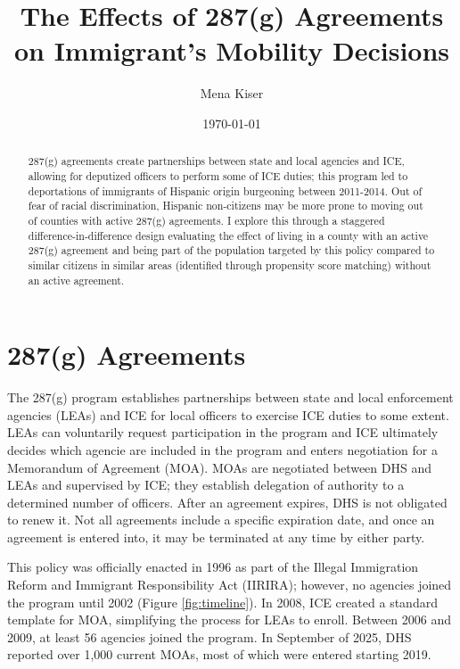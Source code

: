 \documentclass{article}
\title{The Effects of 287(g) Agreements on Immigrant's Mobility Decisions}
\author{Mena Kiser}
\date{\today}
\begin{document}
\doublespacing
\maketitle

\begin{abstract}
    287(g) agreements create partnerships between state and local agencies and ICE, allowing for deputized officers to perform some of ICE duties; this program led to deportations of immigrants of Hispanic origin burgeoning between 2011-2014. Out of fear of racial discrimination, Hispanic non-citizens may be more prone to moving out of counties with active 287(g) agreements. I explore this through a staggered difference-in-difference design evaluating the effect of living in a county with an active 287(g) agreement and being part of the population targeted by this policy compared to similar citizens in similar areas (identified through propensity score matching) without an active agreement. 
\end{abstract}


\section{287(g) Agreements}
The 287(g) program establishes partnerships between state and local enforcement agencies (LEAs) and ICE for local officers to exercise ICE duties to some extent. LEAs can voluntarily request participation in the program and ICE ultimately decides which agencie are included in the program and enters negotiation for a Memorandum of Agreement (MOA). MOAs are negotiated between DHS and LEAs and supervised by ICE; they establish delegation of authority to a determined number of officers. After an agreement expires, DHS is not obligated to renew it. Not all agreements include a specific expiration date, and once an agreement is entered into, it may be terminated at any time by either party.

This policy was officially enacted in 1996 as part of the Illegal Immigration Reform and Immigrant Responsibility Act (IIRIRA); however, no agencies joined the program until 2002 (Figure \ref{fig:timeline}). In 2008, ICE created a standard template for MOA, simplifying the process for LEAs to enroll. Between 2006 and 2009, at least 56 agencies joined the program. In September of 2025, DHS reported over 1,000 current MOAs, most of which were entered starting 2019.
\end{document}
